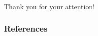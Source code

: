 \documentclass[10pt]{beamer}
\begin{document}
\begin{frame}[t,plain]
  \vfill
  \begin{center}
  {\handwriting\textcolor{tangocolordarkscarletred}{Thank you for your attention! \smiley}}
  \end{center}
  \vfill
\end{frame}

\begin{frame}[t,plain]
  \titlepage%
\end{frame}

\nocite{*}
\begin{frame}
  \frametitle{References}
  \printbibliography
\end{frame}
\end{document}
